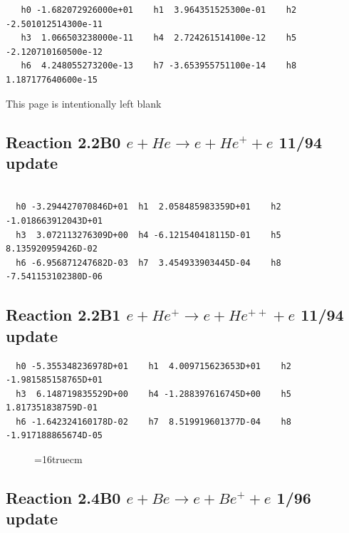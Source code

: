 \documentclass[12pt,dvips]{article}
\begin{document}
\begin{small}\begin{verbatim}
   h0 -1.682072926000e+01    h1  3.964351525300e-01    h2 -2.501012514300e-11
   h3  1.066503238000e-11    h4  2.724261514100e-12    h5 -2.120710160500e-12
   h6  4.248055273200e-13    h7 -3.653955751100e-14    h8  1.187177640600e-15

\end{verbatim}\end{small}
\newpage
This page is intentionally left blank
\newpage


\subsection{
Reaction 2.2B0 $e + He \rightarrow e + He^+ + e $ 11/94 update
}

\begin{small}\begin{verbatim}

  h0 -3.294427070846D+01  h1  2.058485983359D+01    h2 -1.018663912043D+01
  h3  3.072113276309D+00  h4 -6.121540418115D-01    h5  8.135920959426D-02
  h6 -6.956871247682D-03  h7  3.454933903445D-04    h8 -7.541153102380D-06
\end{verbatim}\end{small}

\subsection{
Reaction 2.2B1 $e + He^+ \rightarrow e + He^{++} + e$ 11/94 update
}


\begin{small}\begin{verbatim}
  h0 -5.355348236978D+01    h1  4.009715623653D+01    h2 -1.981585158765D+01
  h3  6.148719835529D+00    h4 -1.288397616745D+00    h5  1.817351838759D-01
  h6 -1.642324160178D-02    h7  8.519919601377D-04    h8 -1.917188865674D-05
\end{verbatim}\end{small}

\begin{figure} \label{e2.2B}
\epsfxsize=16truecm
\end{figure}
\newpage

\subsection{
Reaction 2.4B0 $e + Be \rightarrow e + Be^+ + e $ 1/96 update
}
\end{document}
